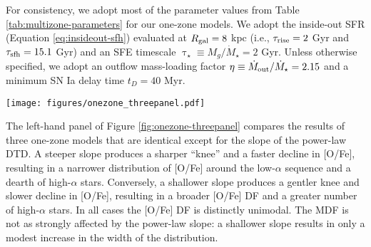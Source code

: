 \documentclass[twocolumn,twocolappendix,linenumbers,trackchanges]{aastex631}
\begin{document}
For consistency, we adopt most of the parameter values from Table \ref{tab:multizone-parameters} for our one-zone models.
We adopt the inside-out SFR (Equation \ref{eq:insideout-sfh}) evaluated at $R_{\rm gal}=8$ kpc (i.e., $\tau_{\rm rise}=2$ Gyr and $\tau_{\rm sfh}=15.1$ Gyr) and an SFE timescale $\uptau_\star\equiv M_g/\dot M_\star=2$ Gyr. Unless otherwise specified, we adopt an outflow mass-loading factor $\eta\equiv \dot M_{\rm out}/\dot M_\star=2.15$  and a minimum SN Ia delay time $t_D=40$ Myr. 

\begin{figure*}
    \centering
    \texttt{[image: figures/onezone\_threepanel.pdf]}
    \caption{{\it Each panel:} Abundance tracks in the [Fe/H]--[O/Fe] plane for one-zone chemical evolution models which assume the same DTD. The open symbols along each curve mark logarithmic steps in time. The top and right-hand marginal panels present the distribution functions (DFs) of [Fe/H] and [O/Fe], respectively. For display purposes, these distributions are convolved with a Gaussian kernel with a standard deviation of 0.02 dex. 
    \textit{Left:} Three models which assume a power-law DTD with varying slope $\alpha$. 
    For reference, the solid gray curve represents an exponential DTD with $\tau=3$ Gyr. 
    \textit{Center:} Three models which assume an exponential DTD with varying timescale $\tau$. 
    \textit{Right:} Three models which assume a plateau DTD with varying plateau width $W$. 
    All assume a post-plateau slope of $\alpha=-1.1$. For reference, the solid gray curve represents an exponential DTD with $\tau=3$ Gyr, and the dotted purple curve represents a power-law DTD with $\alpha=-1.1$ and no plateau.}
    \label{fig:onezone-threepanel}
\end{figure*}

The left-hand panel of Figure \ref{fig:onezone-threepanel} compares the results of three one-zone models that are identical except for the slope of the power-law DTD. A steeper slope produces a sharper ``knee'' and a faster decline in [O/Fe], resulting in a narrower distribution of [O/Fe] around the low-$\alpha$ sequence and a dearth of high-$\alpha$ stars. Conversely, a shallower slope produces a gentler knee and slower decline in [O/Fe], resulting in a broader [O/Fe] DF and a greater number of high-$\alpha$ stars. In all cases the [O/Fe] DF is distinctly unimodal. The MDF is not as strongly affected by the power-law slope: a shallower slope results in only a modest increase in the width of the distribution.
\end{document}
